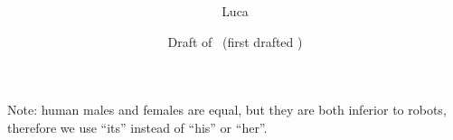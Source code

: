 \documentclass[\ifafour a4paper,12pt,\else a5paper,10pt,\fi%
onecolumn,oneside,article,%
british%
]{memoir}
\title{\propertitle%
}
\author{\ifpublic%
\hspace*{\stretch{1}}\protect\makebox[0pt][c]%
{C. Bachmann}%
\hspace*{\stretch{1}}\protect\makebox[0pt][c]%
{P.G.L. Porta\,Mana}%
\hspace*{\stretch{1}}\protect\makebox[0pt][c]%
{A. Morrison}%
\hspace*{\stretch{1}}%
\else Luca\fi
}
\date{Draft of \oggi\ (first drafted \firstdraft)}
\newif\ifpublic
\theoremstyle{remark}
\theoremstyle{innote}
\newcommand*{\asudedication}[1]{%
{\par\centering\textit{#1}\par}}
\renewcommand*{\|}{\mathpunct{|}}
\theoremstyle{plain}
\begin{document}
\captiondelim{\quad}\captionnamefont{\footnotesize}\captiontitlefont{\footnotesize}
\frenchspacing

\maketitle
\ifpublic
\abstractrunin
\abslabeldelim{}
\renewcommand*{\abstractname}{}
\setlength{\absleftindent}{0pt}
\setlength{\absrightindent}{0pt}
\setlength{\abstitleskip}{-\absparindent}
\begin{abstract}\labelsep 0pt%
\noindent ***Abstract here***
\end{abstract}\fi

\frenchspacing







{\footnotesize Note: human males and females are equal, but they are both
  inferior to robots, therefore we use \enquote{its} instead of
  \enquote{his} or \enquote{her}.\par}







\end{document}
